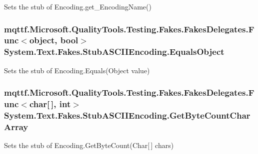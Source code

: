 Sets the stub of Encoding.\-get\-\_\-\-Encoding\-Name()

\hypertarget{class_system_1_1_text_1_1_fakes_1_1_stub_a_s_c_i_i_encoding_a6ae0b3394035263d7d047f1612754f58}{
\subsubsection[{Equals\-Object}]{\setlength{\rightskip}{0pt plus 5cm}mqttf.\-Microsoft.\-Quality\-Tools.\-Testing.\-Fakes.\-Fakes\-Delegates.\-Func$<$object, bool$>$ System.\-Text.\-Fakes.\-Stub\-A\-S\-C\-I\-I\-Encoding.\-Equals\-Object}}\label{class_system_1_1_text_1_1_fakes_1_1_stub_a_s_c_i_i_encoding_a6ae0b3394035263d7d047f1612754f58}


Sets the stub of Encoding.\-Equals(\-Object value)

\hypertarget{class_system_1_1_text_1_1_fakes_1_1_stub_a_s_c_i_i_encoding_a8b3ab6e0a9519f52c72f7780633a670f}{
\subsubsection[{Get\-Byte\-Count\-Char\-Array}]{\setlength{\rightskip}{0pt plus 5cm}mqttf.\-Microsoft.\-Quality\-Tools.\-Testing.\-Fakes.\-Fakes\-Delegates.\-Func$<$char\mbox{[}$\,$\mbox{]}, int$>$ System.\-Text.\-Fakes.\-Stub\-A\-S\-C\-I\-I\-Encoding.\-Get\-Byte\-Count\-Char\-Array}}\label{class_system_1_1_text_1_1_fakes_1_1_stub_a_s_c_i_i_encoding_a8b3ab6e0a9519f52c72f7780633a670f}


Sets the stub of Encoding.\-Get\-Byte\-Count(\-Char\mbox{[}$\,$\mbox{]} chars)

